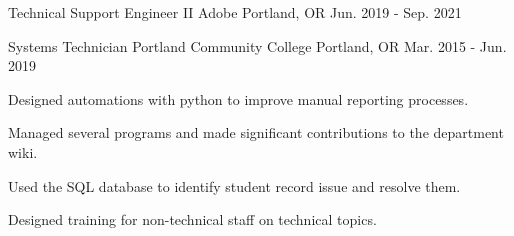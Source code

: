 

\begin{cventries}
  \cventry
    {Technical Support Engineer II} %
    {Adobe} %
    {Portland, OR} %
    {Jun. 2019 - Sep. 2021} %
    {
    }

  \cventry
    {Systems Technician} %
    {Portland Community College} %
    {Portland, OR} %
    {Mar. 2015 - Jun. 2019} %
    {
      \begin{cvitems} %
        \item {Designed automations with python to improve manual reporting processes.}
        \item {Managed several programs and made significant contributions to the department wiki.}
        \item {Used the SQL database to identify student record issue and resolve them.}
        \item {Designed training for non-technical staff on technical topics.}
      \end{cvitems}
    }

\end{cventries}
